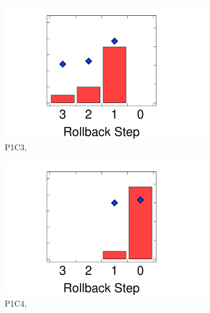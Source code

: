 \begin{figure}[t]
    \hfill
    \begin{subfigure}{.132\linewidth}
        \includegraphics[trim=130 0 150 0,clip,width=\linewidth]{graphs/process/ubench-limit-dist/mem-limit-dist-p1c3.pdf}
        \setlength{\abovecaptionskip}{-9pt}
        \caption{P1C3, \\}
    \end{subfigure}
    \hfill
    \begin{subfigure}{.132\linewidth}
        \includegraphics[trim=130 0 150 0,clip,width=\linewidth]{graphs/process/ubench-limit-dist/mem-limit-dist-p1c4.pdf}
        \setlength{\abovecaptionskip}{-9pt}
        \caption{P1C4, \\}
    \end{subfigure}
    \hfill
    \begin{subfigure}{.132\linewidth}

\end{subfigure}
\end{figure}

